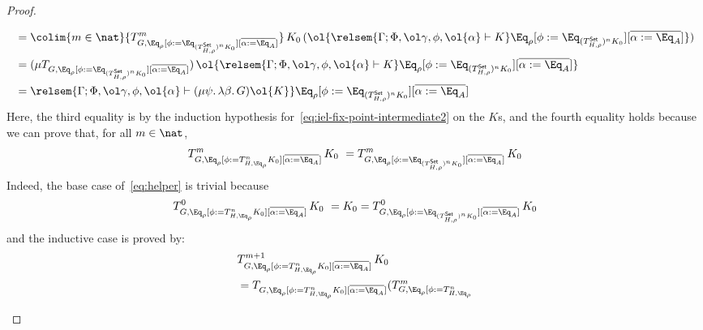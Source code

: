 \documentclass[acmsmall,review,anonymous]{acmart}
\theoremstyle{definition}
\newcommand{\set}{\mathsf{Set}}
\begin{document}
\begin{proof}
\begin{itemize}
\begin{itemize}
\[\begin{split}
&= \colim{m \in \nat} {T^m_{G, \Eq_{\rho}[\phi := \Eq_{(T^{\set}_{H,\rho})^n K_0}][\overline{\alpha := \Eq_A}]}}\,K_0
  \,(\ol{\relsem{\Gamma; \Phi, \ol\gamma, \phi, \ol{\alpha} \vdash K}\Eq_{\rho}
  [\phi := \Eq_{(T^{\set}_{H,\rho})^n K_0}][\overline{\alpha := \Eq_A}]}) \\ 
&= (\mu {T_{G, \Eq_{\rho}[\phi := \Eq_{(T^{\set}_{H,\rho})^n K_0}][\overline{\alpha := \Eq_A}]}})
  \,\ol{\relsem{\Gamma; \Phi, \ol\gamma, \phi, \ol{\alpha} \vdash K}\Eq_{\rho}
  [\phi := \Eq_{(T^{\set}_{H,\rho})^n K_0}][\overline{\alpha := \Eq_A}]} \\ 
&= \relsem{\Gamma; \Phi, \ol\gamma, \phi, \ol{\alpha} \vdash (\mu \psi.\, \lambda \beta.\, G) \ol{K}}
  \Eq_{\rho}[\phi := \Eq_{(T^{\set}_{H,\rho})^n K_0}][\overline{\alpha := \Eq_{A}}]
\end{split}
\]
Here, the third equality is by the induction hypothesis
for~\eqref{eq:iel-fix-point-intermediate2} on the $K$s, and the fourth
equality holds because we can prove that, for all $m \in \nat$,
\begin{equation}\label{eq:helper}
T^m_{G,
\Eq_{\rho}[\phi := T^{n}_{H,\Eq_{\rho}} K_0][\overline{\alpha :=
    \Eq_A}]}\,K_0 \ = T^m_{G, \Eq_{\rho}[\phi :=
    \Eq_{(T^{\set}_{H,\rho})^n K_0}][\overline{\alpha :=
      \Eq_A}]}\,K_0
\end{equation}
Indeed, the base case of~\eqref{eq:helper} is trivial because
\[T^0_{G,
  \Eq_{\rho}[\phi := T^{n}_{H,\Eq_{\rho}} K_0][\overline{\alpha :=
      \Eq_A}]}\,K_0 \ = K_0 = T^0_{G, \Eq_{\rho}[\phi :=
    \Eq_{(T^{\set}_{H,\rho})^n K_0}][\overline{\alpha :=
      \Eq_A}]}\,K_0\]
and the inductive case is proved by: \\
\begin{align*}
& T^{m+1}_{G, \Eq_{\rho}[\phi := T^{n}_{H,\Eq_{\rho}} K_0][\overline{\alpha := \Eq_A}]}\,K_0 \\
&= T_{G, \Eq_{\rho}[\phi := T^{n}_{H,\Eq_{\rho}} K_0][\overline{\alpha
        := \Eq_A}]} (T^{m}_{G, \Eq_{\rho}[\phi := T^{n}_{H,\Eq_{\rho}}
}
\end{align*}
\end{itemize}
\end{itemize}
\end{proof}
\end{document}
